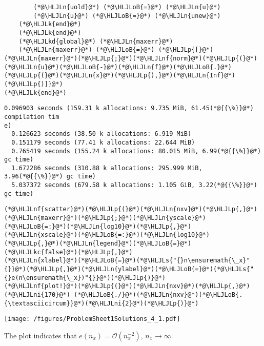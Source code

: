 \documentclass[12pt,a4paper]{article}
\newcommand{\HLJLk}[1]{\textcolor[RGB]{148,91,176}{\textbf{#1}}}
\newcommand{\HLJLkc}[1]{\textcolor[RGB]{59,151,46}{\textit{#1}}}
\newcommand{\HLJLkd}[1]{\textcolor[RGB]{214,102,97}{\textit{#1}}}
\newcommand{\HLJLn}[1]{#1}
\newcommand{\HLJLnf}[1]{\textcolor[RGB]{66,102,213}{#1}}
\newcommand{\HLJLs}[1]{\textcolor[RGB]{201,61,57}{#1}}
\newcommand{\HLJLni}[1]{\textcolor[RGB]{59,151,46}{#1}}
\newcommand{\HLJLoB}[1]{\textcolor[RGB]{102,102,102}{\textbf{#1}}}
\newcommand{\HLJLp}[1]{#1}
\begin{document}
\begin{lstlisting}
        (*@\HLJLn{uold}@*) (*@\HLJLoB{=}@*) (*@\HLJLn{u}@*)
        (*@\HLJLn{u}@*) (*@\HLJLoB{=}@*) (*@\HLJLn{unew}@*)
    (*@\HLJLk{end}@*)
    (*@\HLJLk{end}@*)
    (*@\HLJLkd{global}@*) (*@\HLJLn{maxerr}@*)
    (*@\HLJLn{maxerr}@*) (*@\HLJLoB{=}@*) (*@\HLJLp{[}@*)(*@\HLJLn{maxerr}@*)(*@\HLJLp{;}@*)(*@\HLJLnf{norm}@*)(*@\HLJLp{(}@*)(*@\HLJLn{u}@*)(*@\HLJLoB{-}@*)(*@\HLJLn{f}@*)(*@\HLJLoB{.}@*)(*@\HLJLp{(}@*)(*@\HLJLn{x}@*)(*@\HLJLp{),}@*)(*@\HLJLn{Inf}@*)(*@\HLJLp{)]}@*)
(*@\HLJLk{end}@*)
\end{lstlisting}

\begin{lstlisting}
0.096903 seconds (159.31 k allocations: 9.735 MiB, 61.45(*@{{\%}}@*) compilation tim
e)
  0.126623 seconds (38.50 k allocations: 6.919 MiB)
  0.151179 seconds (77.41 k allocations: 22.644 MiB)
  0.765419 seconds (155.24 k allocations: 80.015 MiB, 6.99(*@{{\%}}@*) gc time)
  1.672286 seconds (310.88 k allocations: 295.999 MiB, 3.96(*@{{\%}}@*) gc time)
  5.037372 seconds (679.58 k allocations: 1.105 GiB, 3.22(*@{{\%}}@*) gc time)
\end{lstlisting}


\begin{lstlisting}
(*@\HLJLnf{scatter}@*)(*@\HLJLp{(}@*)(*@\HLJLn{nxv}@*)(*@\HLJLp{,}@*)(*@\HLJLn{maxerr}@*)(*@\HLJLp{;}@*)(*@\HLJLn{yscale}@*)(*@\HLJLoB{=:}@*)(*@\HLJLn{log10}@*)(*@\HLJLp{,}@*)(*@\HLJLn{xscale}@*)(*@\HLJLoB{=:}@*)(*@\HLJLn{log10}@*)(*@\HLJLp{,}@*)(*@\HLJLn{legend}@*)(*@\HLJLoB{=}@*)(*@\HLJLkc{false}@*)(*@\HLJLp{,}@*)
(*@\HLJLn{xlabel}@*)(*@\HLJLoB{=}@*)(*@\HLJLs{"{}n\ensuremath{\_x}"{}}@*)(*@\HLJLp{,}@*)(*@\HLJLn{ylabel}@*)(*@\HLJLoB{=}@*)(*@\HLJLs{"{}e(n\ensuremath{\_x})"{}}@*)(*@\HLJLp{)}@*)
(*@\HLJLnf{plot!}@*)(*@\HLJLp{(}@*)(*@\HLJLn{nxv}@*)(*@\HLJLp{,}@*)(*@\HLJLni{170}@*) (*@\HLJLoB{./}@*)(*@\HLJLn{nxv}@*)(*@\HLJLoB{.{\textasciicircum}}@*)(*@\HLJLni{2}@*)(*@\HLJLp{)}@*)
\end{lstlisting}

\texttt{[image: /figures/ProblemSheet1Solutions\_4\_1.pdf]}

The plot indicates that $e(n_x) = \mathcal{O}(n_x^{-2})$, $n_x \to \infty$.
\end{document}
